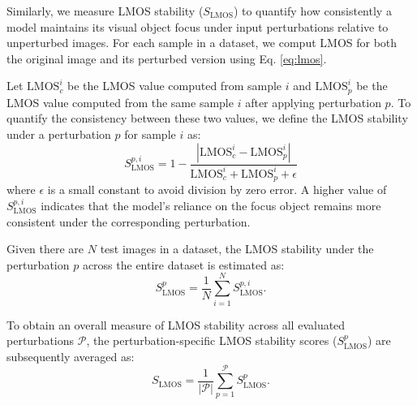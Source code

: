 \documentclass[a4paper,fleqn]{cas-dc}
\begin{document}
	
	Similarly, we measure LMOS stability ($S_{\mathrm{LMOS}}$) to quantify how consistently a model maintains its visual object focus under input perturbations relative to unperturbed images.
	For each sample in a dataset, we comput LMOS for both the original image and its perturbed version using Eq. \ref{eq:lmos}.  
	
	Let $\mathrm{LMOS}^i_c$ be the LMOS value computed from sample $i$ and $\mathrm{LMOS}^i_p$ be the LMOS value computed from the same sample $i$  after applying perturbation $p$. 
	To quantify the consistency between these two values, we define the LMOS stability under a perturbation $p$ for sample $i$ as:
	$$S^{p, i}_{\textrm{LMOS}} = 1 - \frac{|\mathrm{LMOS}^i_c - \mathrm{LMOS}^i_p|}{\mathrm{LMOS}^i_c + \mathrm{LMOS}^i_p + \epsilon}$$ 
	where $\epsilon$ is a small constant to avoid division by zero error. 
	A higher value of $S^{p,i}_{\textrm{LMOS}}$ indicates that the model's reliance on the focus object remains more consistent under the corresponding perturbation. 

	Given there are $N$ test images in a dataset, the LMOS stability under the perturbation $p$ across the entire dataset is estimated as:
	$$	S_{\mathrm{LMOS}}^p= \frac{1}{N} \sum_{i=1}^{N}S_{\mathrm{LMOS}}^{p,i}.$$
	
	To obtain an overall measure of LMOS stability across all evaluated perturbations $\mathcal P$, the perturbation-specific LMOS stability scores ($S_{\mathrm{LMOS}}^p$) are subsequently averaged as:
	$$S_{\mathrm{LMOS}}=\frac{1}{|\mathcal P|}\sum_{p=1}^{\mathcal P} S_{\mathrm{LMOS}}^p.$$
	
\end{document}
